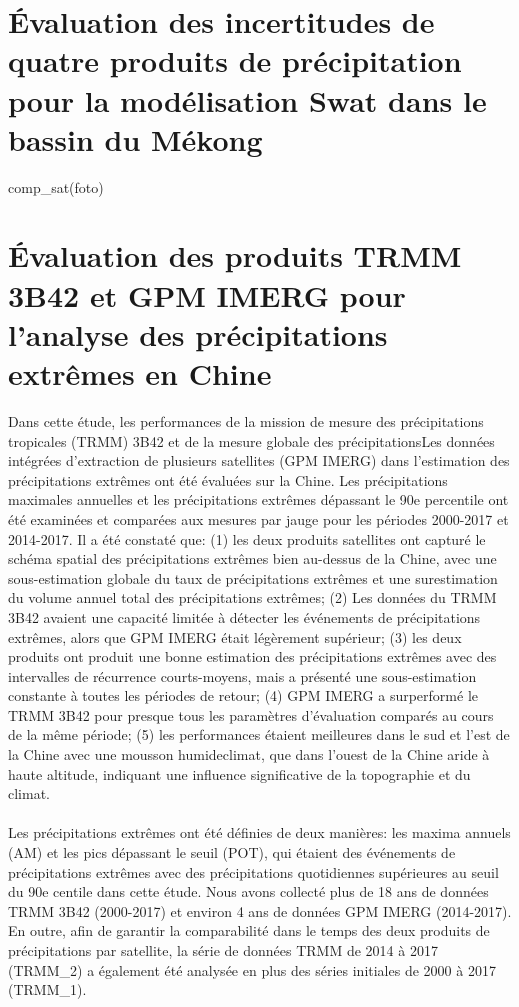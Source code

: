 \section{Évaluation des incertitudes de quatre produits de précipitation pour la modélisation Swat dans le bassin du Mékong}
\cite{tang_assessing_2019} comp_sat(foto)

\section{Évaluation des produits TRMM 3B42 et GPM IMERG pour l'analyse des précipitations extrêmes en Chine}
Dans cette étude, les performances de la mission de mesure des précipitations tropicales (TRMM) 3B42 et de la mesure globale des précipitationsLes données intégrées d'extraction de plusieurs satellites (GPM IMERG) dans l'estimation des précipitations extrêmes ont été évaluées sur la Chine. Les précipitations maximales annuelles et les précipitations extrêmes dépassant le 90e percentile ont été examinées et comparées aux mesures par jauge pour les périodes 2000-2017 et 2014-2017. Il a été constaté que: (1) les deux produits satellites ont capturé le schéma spatial des précipitations extrêmes bien au-dessus de la Chine, avec une sous-estimation globale du taux de précipitations extrêmes et une surestimation du volume annuel total des précipitations extrêmes; (2) Les données du TRMM 3B42 avaient une capacité limitée à détecter les événements de précipitations extrêmes, alors que GPM IMERG était légèrement supérieur; (3) les deux produits ont produit une bonne estimation des précipitations extrêmes avec des intervalles de récurrence courts-moyens, mais a présenté une sous-estimation constante à toutes les périodes de retour; (4) GPM IMERG a surperformé le TRMM 3B42 pour presque tous les paramètres d’évaluation comparés au cours de la même période; (5) les performances étaient meilleures dans le sud et l'est de la Chine avec une mousson humideclimat, que dans l'ouest de la Chine aride à haute altitude, indiquant une influence significative de la topographie et du climat. \\ \ \\
Les précipitations extrêmes ont été définies de deux manières: les maxima annuels (AM) et les pics dépassant le seuil (POT), qui étaient des événements de précipitations extrêmes avec des précipitations quotidiennes supérieures au seuil du 90e centile dans cette étude. Nous avons collecté plus de 18 ans de données TRMM 3B42 (2000-2017) et environ 4 ans de données GPM IMERG (2014-2017). En outre, afin de garantir la comparabilité dans le temps des deux produits de précipitations par satellite, la série de données TRMM de 2014 à 2017 (TRMM_2) a également été analysée en plus des séries initiales de 2000 à 2017 (TRMM_1).\\ \ \\
